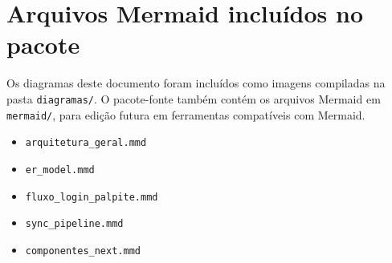 \documentclass[12pt,a4paper]{article}
\begin{document}
\section{Arquivos Mermaid incluídos no pacote}

Os diagramas deste documento foram incluídos como imagens compiladas na pasta \texttt{diagramas/}. O pacote-fonte também contém os arquivos Mermaid em \texttt{mermaid/}, para edição futura em ferramentas compatíveis com Mermaid.

\begin{itemize}
  \item \texttt{arquitetura\_geral.mmd}
  \item \texttt{er\_model.mmd}
  \item \texttt{fluxo\_login\_palpite.mmd}
  \item \texttt{sync\_pipeline.mmd}
  \item \texttt{componentes\_next.mmd}
\end{itemize}
\end{document}
